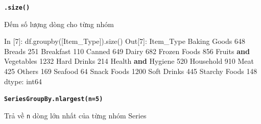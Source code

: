 \documentclass[
]{book}
\newenvironment{Shaded}{\begin{snugshade}}{\end{snugshade}}
\newcommand{\DecValTok}[1]{\textcolor[rgb]{0.00,0.00,0.81}{#1}}
\newcommand{\KeywordTok}[1]{\textcolor[rgb]{0.13,0.29,0.53}{\textbf{#1}}}
\newcommand{\NormalTok}[1]{#1}
\newcommand{\StringTok}[1]{\textcolor[rgb]{0.31,0.60,0.02}{#1}}
\begin{document}
\textbf{\texttt{.size()}}

Đếm số lượng dòng cho từng nhóm

\begin{Shaded}
\begin{Highlighting}[]
\NormalTok{In [}\DecValTok{7}\NormalTok{]: df.groupby([}\StringTok{\textquotesingle{}Item\_Type\textquotesingle{}}\NormalTok{]).size()}
\NormalTok{Out[}\DecValTok{7}\NormalTok{]:}
\NormalTok{Item\_Type}
\NormalTok{Baking Goods              }\DecValTok{648}
\NormalTok{Breads                    }\DecValTok{251}
\NormalTok{Breakfast                 }\DecValTok{110}
\NormalTok{Canned                    }\DecValTok{649}
\NormalTok{Dairy                     }\DecValTok{682}
\NormalTok{Frozen Foods              }\DecValTok{856}
\NormalTok{Fruits }\KeywordTok{and}\NormalTok{ Vegetables    }\DecValTok{1232}
\NormalTok{Hard Drinks               }\DecValTok{214}
\NormalTok{Health }\KeywordTok{and}\NormalTok{ Hygiene        }\DecValTok{520}
\NormalTok{Household                 }\DecValTok{910}
\NormalTok{Meat                      }\DecValTok{425}
\NormalTok{Others                    }\DecValTok{169}
\NormalTok{Seafood                    }\DecValTok{64}
\NormalTok{Snack Foods              }\DecValTok{1200}
\NormalTok{Soft Drinks               }\DecValTok{445}
\NormalTok{Starchy Foods             }\DecValTok{148}
\NormalTok{dtype: int64}
\end{Highlighting}
\end{Shaded}

\textbf{\texttt{SeriesGroupBy.nlargest(n=5)}}

Trả về \texttt{n} dòng lớn nhất của từng nhóm Series
\end{document}
